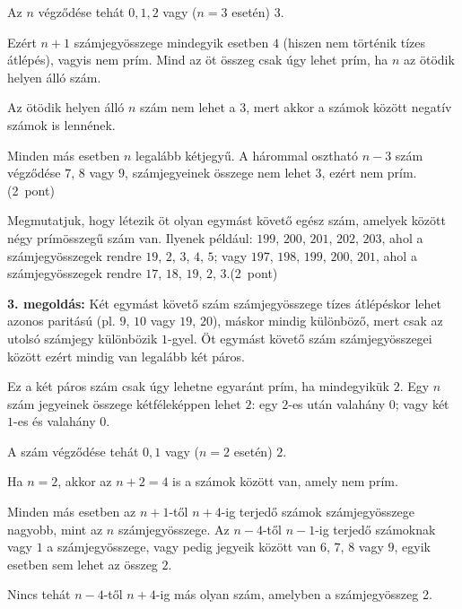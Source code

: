 \documentclass[a4paper,10pt]{article}
\begin{document}
\smallskip

\noindent Az $n$ végződése tehát $0, 1, 2$ vagy ($n = 3$ esetén) $3$. 

\noindent Ezért $n+1$ számjegyösszege mindegyik esetben $4$ (hiszen nem történik tízes átlépés), vagyis nem prím. Mind az öt összeg csak úgy lehet prím, ha $n$ az ötödik helyen álló szám.

\smallskip

\noindent Az ötödik helyen álló $n$ szám nem lehet a $3$, mert akkor a számok között negatív számok is lennének.

\noindent Minden más esetben $n$ legalább kétjegyű. A hárommal osztható $n-3$ szám végződése $7$, $8$ vagy $9$, számjegyeinek összege nem lehet $3$, ezért nem prím.\hfill (2~pont)%

\smallskip

\noindent Megmutatjuk, hogy létezik öt olyan egymást követő egész szám, amelyek között négy prímösszegű szám van.
Ilyenek például: $199$, $200$, $201$, $202$, $203$, ahol a számjegyösszegek rendre $19$, $2$, $3$, $4$, $5$; vagy $197$, $198$, $199$, $200$, $201$, ahol a számjegyösszegek rendre $17$, $18$, $19$, $2$, $3$.\hfill (2~pont)%

\medskip

{\bf 3. megoldás: } Két egymást követő szám számjegyösszege tízes átlépéskor lehet azonos paritású (pl. $9$, $10$ vagy $19$, $20$), máskor mindig különböző, mert csak az utolsó számjegy különbözik $1$-gyel.
Öt egymást követő szám számjegyösszegei között ezért mindig van legalább két páros.

\smallskip

\noindent Ez a két páros szám csak úgy lehetne egyaránt prím, ha mindegyikük $2$.
Egy $n$ szám jegyeinek összege kétféleképpen lehet $2$: 
egy $2$-es után valahány $0$; vagy két $1$-es és valahány $0$.

\smallskip

\noindent A szám végződése tehát $0, 1$ vagy ($n = 2$ esetén) $2$.

\noindent Ha $n = 2$, akkor az $n + 2 = 4$ is a számok között van, amely nem prím.

\noindent Minden más esetben az $n+1$-től $n+4$-ig terjedő számok számjegyösszege nagyobb, mint az $n$ számjegyösszege. Az $n-4$-től $n-1$-ig terjedő számoknak vagy $1$ a számjegyösszege, vagy pedig jegyeik között van $6$, $7$, $8$ vagy $9$, egyik esetben sem lehet az összeg $2$. 

\noindent Nincs tehát $n-4$-től $n + 4$-ig más olyan szám, amelyben a számjegyösszeg 2.
\end{document}

